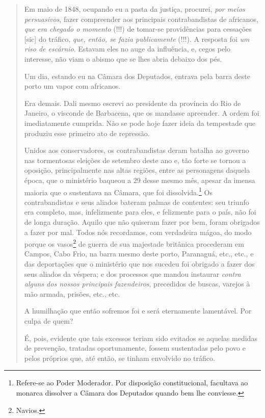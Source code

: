 {\begin{quote}
Em maio de 1848, ocupando eu a pasta da justiça, procurei, \emph{por
meios persuasivos}, fazer compreender aos principais contrabandistas de
africanos, \emph{que era chegado o momento} (!!!) de tomar-se
providências para cessações {[}sic{]} do tráfico, \emph{que, então, se
fazia publicamente} (!!!). A resposta foi \textit{um riso de escárnio}. Estavam
eles no auge da influência, e, cegos pelo interesse, não viam o abismo
que se lhes abria debaixo dos pés.

Um dia, estando eu na Câmara dos Deputados, entrava pela barra deste
porto um vapor com africanos.

Era demais. Dali mesmo escrevi ao presidente da província do Rio de
Janeiro, o visconde de Barbacena, que os mandasse apreender. A ordem foi
imediatamente cumprida. Não se pode hoje fazer ideia da tempestade que
produziu esse primeiro ato de repressão.

Unidos aos conservadores, os contrabandistas deram batalha ao governo
nas tormentosas eleições de setembro deste ano e, tão forte se tornou a
oposição, principalmente nas altas regiões, entre as personagens daquela
época, que o ministério baqueou a 29 desse mesmo mês, apesar da imensa
maioria que o sustentava na Câmara, que foi dissolvida.\footnote{
  Refere-se ao Poder Moderador. Por disposição constitucional,
  facultava ao monarca dissolver a Câmara dos Deputados quando bem lhe
  conviesse.} Os contrabandistas e seus aliados bateram palmas de
contentes: seu triunfo era completo, mas, infelizmente para eles, e
felizmente para o país, não foi de longa duração. Aquilo que não
quiseram fazer por bem, foram obrigados a fazer por mal. Todos nós
recordamos, com verdadeira mágoa, do modo porque os vasos\footnote{
  Navios.} de guerra de sua majestade britânica procederam em Campos,
Cabo Frio, na barra mesmo deste porto, Paranaguá, etc., etc., e das
deportações que o ministério que nos sucedeu foi obrigado a fazer dos
seus aliados da véspera; e dos processos que mandou instaurar
\emph{contra alguns dos nossos principais fazendeiros}, precedidos de
buscas, varejos à mão armada, prisões, etc., etc.

A humilhação que então sofremos foi e será eternamente lamentável. Por
culpa de quem?

É, pois, evidente que tais excessos teriam sido evitados se aquelas
medidas de prevenção, tratadas oportunamente, fossem sustentadas pelo
povo e pelos próprios que, até então, se tinham envolvido no tráfico.


\end{quote}}
